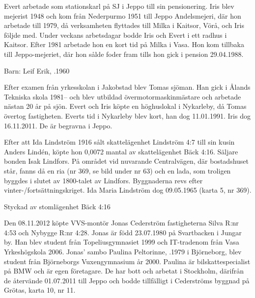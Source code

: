 Evert arbetade som 	stationskarl på SJ i Jeppo till sin pensionering. Iris blev mejerist 1948 och kom från Nederpurmo 1951 till Jeppo Andelsmejeri, där hon arbetade till 1979, då verksamheten flyttades till Milka i Kaitsor, Vörå, och Iris följde med. Under veckans arbetsdagar bodde Iris och Evert i ett radhus i Kaitsor. Efter 1981 arbetade hon en kort tid på Milka i Vasa. Hon kom tillbaka till Jeppo-mejeriet, där hon sålde foder fram tills hon gick i pension 29.04.1988.

Barn: 	 Leif Erik,	.1960

Efter examen från yrkesskolan i Jakobstad blev Tomas sjöman. Han gick i Ålands Tekniska skola 1981-- och blev utbildad övermotormaskinmästare och arbetade nästan 20 år på sjön. Evert och Iris köpte en höghuslokal i Nykarleby, då Tomas övertog fastigheten. Everts tid i Nykarleby blev kort, han dog 11.01.1991. Iris dog 16.11.2011. De är begravna i Jeppo.


Efter att Ida Lindström 1916 sålt skattelägenhet Lindström 4:7 till sin	kusin Anders Lindén, köpte hon 0,0072 mantal av skattelägenhet Bäck 4:16. Säljare bonden Isak Lindfors. På området vid nuvarande Centralvägen, där bostadshuset står, fanns då en ria (nr 369, se bild under nr 63) och en lada, som troligen byggdes i slutet av 1800-talet av Lindfors. Byggnaderna revs efter vinter-/fortsättningskriget. Ida Maria Lindström dog 09.05.1965 (karta 5, nr 369).




Styckad av stomlägenhet Bäck 4:16


Den 08.11.2012 köpte VVS-montör Jonas Cederström fastigheterna Silva R:nr 4:53 och Nybygge R:nr 4:28. Jonas är född 23.07.1980 på Svartbacken i Jungar by. Han blev student från Topeliusgymnasiet 1999 och IT-tradenom från Vasa Yrkeshögskola 2006. Jonas' sambo Paulina Peltorinne, .1979 i Björneborg, blev student från Björneborgs Vuxengymnasium år 2000. Paulina är bilskattespecialist på BMW och är egen företagare. De har bott och arbetat i Stockholm, därifrån de återvände 01.07.2011 till Jeppo och bodde tillfälligt i Cederströms byggnad på Grötas, karta 10, nr 11.
\begin{jhchildren}
  \item {}
  \item {}
\end{jhchildren}


